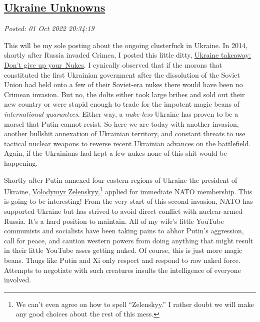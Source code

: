 %

\subsection*{\href{http://analyzethedatanotthedrivel.org/2022/10/01/ukraine-unknowns/}{Ukraine Unknowns}}


\noindent\emph{Posted: 01 Oct 2022 20:34:19}
\vspace{6pt}

This will be my sole posting about the ongoing clusterfuck in Ukraine.
In 2014, shortly after Russia invaded Crimea, I posted this little
ditty,
\href{https://analyzethedatanotthedrivel.org/2014/04/18/ukraine-takeaway-dont-give-up-your-nukes/}{\uline{Ukraine
takeaway: Don't give up your~Nukes}}. I cynically observed that if the
morons that constituted the first Ukrainian government after the
dissolution of the Soviet Union had held onto a few of their Soviet-era
nukes there would have been no Crimean invasion. But no, the dolts
either took large bribes and sold out their new country or were stupid
enough to trade for the impotent magic beans of \emph{international
guarantees}. Either way, a \emph{nuke-less} Ukraine has proven to be a
morsel that Putin cannot resist. So here we are today with another
invasion, another bullshit annexation of Ukrainian territory, and
constant threats to use tactical nuclear weapons to reverse recent
Ukrainian advances on the battlefield. Again, if the Ukrainians had kept
a few nukes none of this shit would be happening.

Shortly after Putin annexed four eastern regions of Ukraine the
president of Ukraine,
\href{https://www.cnn.com/2022/03/17/politics/how-to-spell-volodymyr-zelenskyy/index.html}{Volodymyr
Zelenskyy,}\footnote{We can't even agree on how to spell ``Zelenskyy.'' I rather doubt we
  will make any good choices about the rest of this
  mess.} applied for immediate NATO membership. This is going to be interesting!
From the very start of this second invasion, NATO has supported Ukraine
but has strived to avoid direct conflict with nuclear-armed Russia. It's
a hard position to maintain. All of my wife's little YouTube communists
and socialists have been taking pains to abhor Putin's aggression, call
for peace, and caution western powers from doing anything that might
result in their little YouTube asses getting nuked. Of course, this is
just more magic beans. Thugs like Putin and Xi only respect and respond
to raw naked force. Attempts to negotiate with such creatures insults
the intelligence of everyone involved.

